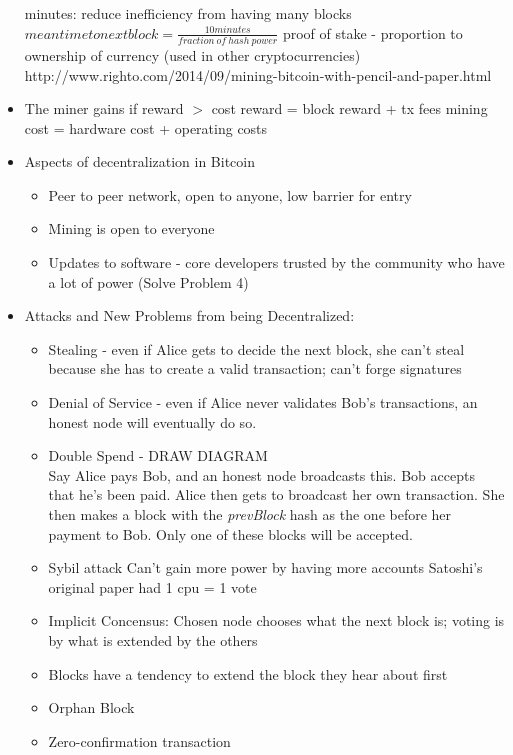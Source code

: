 \documentclass{article}
\begin{document}
\begin{itemize}
     minutes: reduce inefficiency from having many blocks
    \subitem $ mean time to next block = \frac{10 minutes}{fraction\ of\ hash\ power} $
    \subitem proof of stake - proportion to ownership of currency (used in other cryptocurrencies)
    \subitem http://www.righto.com/2014/09/mining-bitcoin-with-pencil-and-paper.html
  \item The miner gains if reward $>$ cost
    \subitem reward = block reward + tx fees
    \subitem mining cost = hardware cost + operating costs
  \item Aspects of decentralization in Bitcoin
    \begin{itemize}
      \item Peer to peer network, open to anyone, low barrier for entry
      \item Mining is open to everyone
      \item Updates to software - core developers trusted by the community who have a lot of power (Solve Problem 4)
    \end{itemize}
  \item Attacks and New Problems from being Decentralized:
    \begin{itemize}
      \item Stealing - even if Alice gets to decide the next block, she can't steal because she has to create
        a valid transaction; can't forge signatures
      \item Denial of Service - even if Alice never validates Bob's transactions, an honest node will eventually do so.
      \item Double Spend - DRAW DIAGRAM\\ Say Alice pays Bob, and an honest node broadcasts this. Bob accepts that he's been paid. Alice then
        gets to broadcast her own transaction. She then makes a block with the \emph{prevBlock} hash as the one before her payment to Bob.
        Only one of these blocks will be accepted. 
      \item Sybil attack
        \subitem Can't gain more power by having more accounts
        \subitem Satoshi's original paper had 1 cpu = 1 vote
      \item Implicit Concensus:
        \subitem Chosen node chooses what the next block is; voting is by what is extended by the others
      \item Blocks have a tendency to extend the block they hear about first
      \item Orphan Block
      \item Zero-confirmation transaction

\end{itemize}
\end{itemize}
\end{document}
